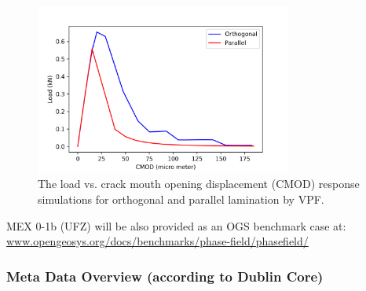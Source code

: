 \begin{figure}[!ht]
\centering
\includegraphics[width=0.75\textwidth]{figures/VPF_ME1_ex_NF_CMOD.png}
\caption{The load vs. crack mouth opening displacement (CMOD) response simulations for orthogonal and parallel lamination by VPF.}
\label{fig:Keita_ME1_VPF_Claystone}
\end{figure}

MEX 0-1b (UFZ) will be also provided as an OGS benchmark case at:\\
\small
\url{www.opengeosys.org/docs/benchmarks/phase-field/phasefield/}
\normalsize

\clearpage
\subsubsection*{Meta Data Overview (according to Dublin Core)}

